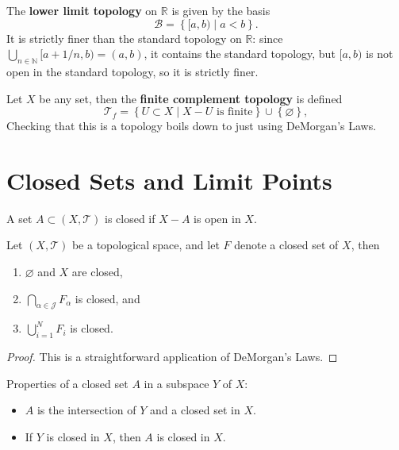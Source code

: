 \documentclass[twoside,10pt]{report}
\begin{document}
\begin{ex}[]
	The \textbf{lower limit topology} on $\mathbb{R}$ is given by the basis
	\[
		\mathcal{B}= \left\{ [a,b) \;|\; a < b \right\}.
	\] It is strictly finer than the standard topology on $\mathbb{R}$: since $\bigcup_{n\in \mathbb{N}}[a + 1/n, b)=(a,b)$, it contains the standard topology, but $[a,b)$ is not open in the standard topology, so it is strictly finer.
\end{ex}

\begin{ex}[]
	Let $X$ be any set, then the \textbf{finite complement topology} is defined
	\[
		\mathcal{T}_f = \left\{ U \subset X \;|\; X-U \text{ is finite} \right\} \cup\left\{ \varnothing \right\},
	\] 
	Checking that this is a topology boils down to just using DeMorgan's Laws.
\end{ex}


\section{Closed Sets and Limit Points}

\begin{defn}
	A set $A \subset (X, \mathcal{T})$ is closed if $X-A$ is open in $X$.
\end{defn}

\begin{thrm}
	Let $(X, \mathcal{T})$ be a topological space, and let $F$ denote a closed set of $X$, then
	\begin{enumerate}
		\item $\varnothing$ and $X$ are closed,
		\item $\bigcap_{\alpha\in\mathcal{J}}F_\alpha$ is closed, and
		\item $\bigcup_{i=1}^N F_i$ is closed.
	\end{enumerate}
\end{thrm}
\begin{proof}
This is a straightforward application of DeMorgan's Laws.
\end{proof}
Properties of a closed set $A$ in a subspace $Y$ of $X$:
\begin{itemize}
	\item $A$ is the intersection of $Y$ and a closed set in $X$.
	\item If $Y$ is closed in $X$, then $A$ is closed in $X$.
\end{itemize}
\end{document}
